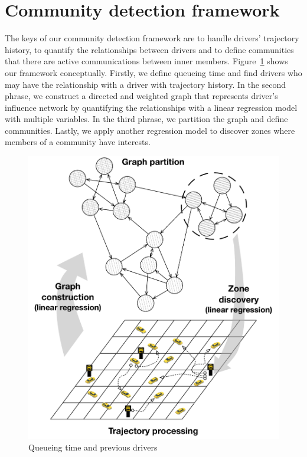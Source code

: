 \documentclass{article}
\begin{document}
\section{Community detection framework} \label{sec:comDectectionFramework}

The keys of our community detection framework are to handle drivers’ trajectory history, to quantify the relationships between drivers and to define communities that there are active communications between inner members. Figure~\ref{fig:frameworkOutline} shows our framework conceptually. Firstly, we define queueing time and find drivers who may have the relationship with a driver with trajectory history. In the second phrase, we construct a directed and weighted graph that represents driver's influence network by quantifying the relationships with a linear regression model with multiple variables. In the third phrase, we partition the graph and define communities. Lastly, we apply another regression model to discover zones where members of a community have interests.


\begin{figure} [h]
  \centering
  \includegraphics[width=.8\linewidth]{figs/frameworkOutline}
  \caption{Queueing time and previous drivers}
  \label{fig:frameworkOutline}
\end{figure}
\end{document}
